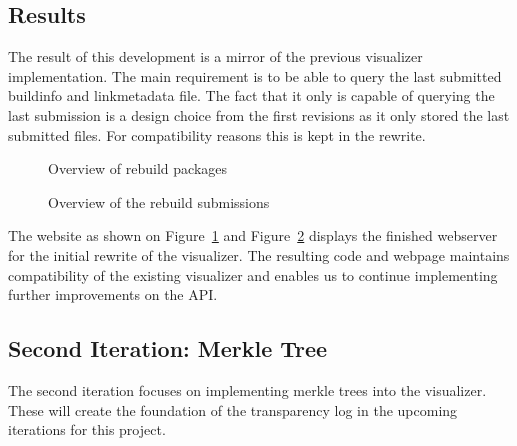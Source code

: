 \documentclass[../Main/thesis.tex]{subfiles}
\begin{document}
\subsection*{Results}%
\label{sub:first_iteration_results}

The result of this development is a mirror of the previous visualizer
implementation. The main requirement is to be able to query the last submitted
buildinfo and linkmetadata file. The fact that it only is capable of querying
the last submission is a design choice from the first revisions as it only
stored the last submitted files. For compatibility reasons this is kept in the
rewrite.

\begin{figure}[H]
\caption{Overview of rebuild packages}%
\label{fig:rebuild-overview} 
\end{figure}

\begin{figure}[H]
\caption{Overview of the rebuild submissions}%
\label{fig:submission-overview} 
\end{figure}

The website as shown on Figure~\ref{fig:rebuild-overview} and
Figure~\ref{fig:submission-overview} displays the finished webserver for the
initial rewrite of the visualizer. The resulting code and webpage maintains
compatibility of the existing visualizer and enables us to continue implementing
further improvements on the API.

\subsection{Second Iteration: Merkle Tree}%
\label{sub:merkle_tree}
The second iteration focuses on implementing merkle trees into the visualizer.
These will create the foundation of the transparency log in the upcoming
iterations for this project.
\end{document}
